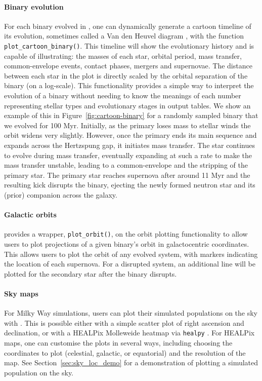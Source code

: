 \documentclass[twocolumn, twocolappendix, oneside]{aastex631}
\newcommand{\codestyle}[1]{{\color{codecolour} \texttt{#1}}}
\begin{document}
\paragraph{Binary evolution} For each binary evolved in \cogsworth, one can dynamically generate a cartoon timeline of its evolution, sometimes called a Van den Heuvel diagram \citep{vandenheuvel:76}, with the function \codestyle{plot\_cartoon\_binary()}. This timeline will show the evolutionary history and is capable of illustrating: the masses of each star, orbital period, mass transfer, common-envelope events, contact phases, mergers and supernovae. The distance between each star in the plot is directly scaled by the orbital separation of the binary (on a log-scale). This functionality provides a simple way to interpret the evolution of a binary without needing to know the meanings of each number representing stellar types and evolutionary stages in \cosmic output tables. We show an example of this in Figure~\ref{fig:cartoon-binary} for a randomly sampled binary that we evolved for 100 Myr. Initially, as the primary loses mass to stellar winds the orbit widens very slightly. However, once the primary ends its main sequence and expands across the Hertzspung gap, it initiates mass transfer. The star continues to evolve during mass transfer, eventually expanding at such a rate to make the mass transfer unstable, leading to a common-envelope and the stripping of the primary star. The primary star reaches supernova after around 11 Myr and the resulting kick disrupts the binary, ejecting the newly formed neutron star and its (prior) companion across the galaxy.

\paragraph{Galactic orbits} \cogsworth provides a wrapper, \codestyle{plot\_orbit()}, on the \gala orbit plotting functionality to allow users to plot projections of a given binary's orbit in galactocentric coordinates. This allows users to plot the orbit of any evolved system, with markers indicating the location of each supernova. For a disrupted system, an additional line will be plotted for the secondary star after the binary disrupts.

\paragraph{Sky maps} For Milky Way simulations, users can plot their simulated populations on the sky with \cogsworth. This is possible either with a simple scatter plot of right ascension and declination, or with a HEALPix Molleweide heatmap via \texttt{healpy} \citep{Zonca2019, 2005ApJ...622..759G}. For HEALPix maps, one can customise the plots in several ways, including choosing the coordinates to plot (celestial, galactic, or equatorial) and the resolution of the map. See Section~\ref{sec:sky_loc_demo} for a demonstration of plotting a simulated population on the sky.
\end{document}
